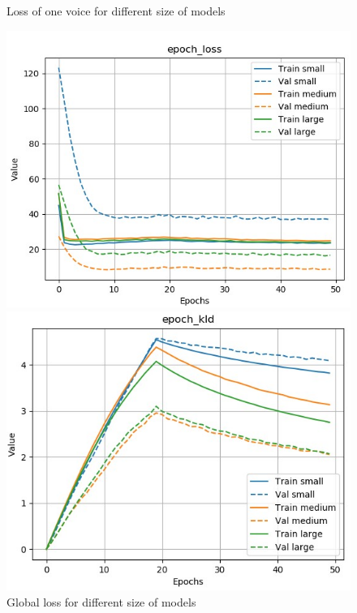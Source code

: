 \documentclass[12pt]{report}
\begin{document}
\begin{figure}[htbp]
\begin{minipage}{0.5 \textwidth}
\begin{center}
            \caption{Loss of one voice for different size of models}
            \label{fig:acc-output-comparison-size}
        \end{center}
    \end{minipage}
\end{figure}

\begin{figure}[htbp]
    \begin{minipage}{0.5\textwidth}
        \begin{center}
            \includegraphics[width=\textwidth]{images/experiences/size/loss-comparison-size.jpg}
            \caption{Global loss for different size of models}
            \label{fig:loss-comparison-size}
        \end{center}
    \end{minipage} \hfill
    \begin{minipage}{0.5 \textwidth}
        \begin{center}
            \includegraphics[width=\textwidth]{images/experiences/size/kld-comparison-size.jpg}

\end{center}
\end{minipage}
\end{figure}
\end{document}
